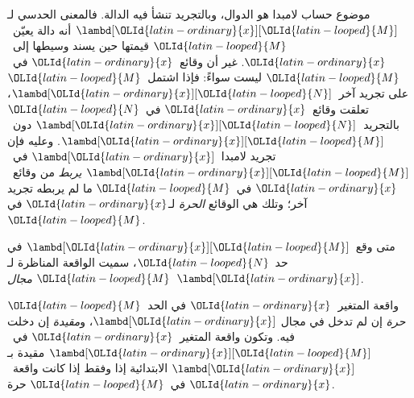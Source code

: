 \documentclass[../../../include/open-logic-section]{subfiles}
\begin{document}

موضوع حساب لامبدا هو الدوال، وبالتجريد تنشأ فيه الدالة.
فالمعنى الحدسي لـ$\lambd[{\OLId{latin-ordinary}{x}}][{\OLId{latin-looped}{M}}]$ أنه دالة يعيّن~${\OLId{latin-looped}{M}}$ قيمتها حين يسند وسيطها إلى~${\OLId{latin-ordinary}{x}}$.
غير أن وقائع~${\OLId{latin-ordinary}{x}}$ في~${\OLId{latin-looped}{M}}$ ليست سواءً: فإذا اشتمل~${\OLId{latin-looped}{M}}$ على تجريد آخر~$\lambd[{\OLId{latin-ordinary}{x}}][{\OLId{latin-looped}{N}}]$،
تعلقت وقائع~${\OLId{latin-ordinary}{x}}$ في~${\OLId{latin-looped}{N}}$ بالتجريد~$\lambd[{\OLId{latin-ordinary}{x}}][{\OLId{latin-looped}{N}}]$ دون~$\lambd[{\OLId{latin-ordinary}{x}}][{\OLId{latin-looped}{M}}]$.
وعليه فإن تجريد لامبدا~$\lambd[{\OLId{latin-ordinary}{x}}]$ في~$\lambd[{\OLId{latin-ordinary}{x}}][{\OLId{latin-looped}{M}}]$ \emph{يربط}
من وقائع~${\OLId{latin-ordinary}{x}}$ في~${\OLId{latin-looped}{M}}$ ما لم يربطه تجريد آخر؛ وتلك هي الوقائع \emph{الحرة} لـ${\OLId{latin-ordinary}{x}}$ في~${\OLId{latin-looped}{M}}$.

\begin{defn}[المجال]
متى وقع~$\lambd[{\OLId{latin-ordinary}{x}}][{\OLId{latin-looped}{M}}]$ في حد~${\OLId{latin-looped}{N}}$، سميت الواقعة المناظرة لـ${\OLId{latin-looped}{M}}$
\emph{مجال}~$\lambd[{\OLId{latin-ordinary}{x}}]$.
\end{defn}

\begin{defn}
  واقعة المتغير~${\OLId{latin-ordinary}{x}}$ في الحد~${\OLId{latin-looped}{M}}$ \emph{حرة} إن لم تدخل في مجال
  $\lambd[{\OLId{latin-ordinary}{x}}]$، و\emph{مقيدة} إن دخلت فيه. وتكون واقعة المتغير~${\OLId{latin-ordinary}{x}}$
  في~$\lambd[{\OLId{latin-ordinary}{x}}][{\OLId{latin-looped}{M}}]$ مقيدة بـ$\lambd[{\OLId{latin-ordinary}{x}}]$ الابتدائية إذا وفقط إذا كانت
  واقعة~${\OLId{latin-ordinary}{x}}$ في~${\OLId{latin-looped}{M}}$ حرة.
\end{defn}
\end{document}
